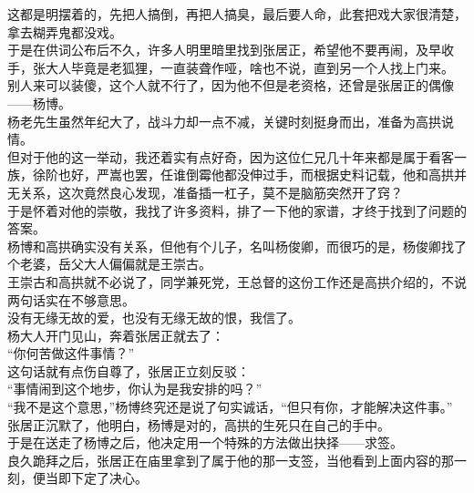 \begin{multicols}{\theparacolNo}
这都是明摆着的，先把人搞倒，再把人搞臭，最后要人命，此套把戏大家很清楚，拿去糊弄鬼都没戏。\\

于是在供词公布后不久，许多人明里暗里找到张居正，希望他不要再闹，及早收手，张大人毕竟是老狐狸，一直装聋作哑，啥也不说，直到另一个人找上门来。\\

别人来可以装傻，这个人就不行了，因为他不但是老资格，还曾是张居正的偶像——杨博。\\

杨老先生虽然年纪大了，战斗力却一点不减，关键时刻挺身而出，准备为高拱说情。\\

但对于他的这一举动，我还着实有点好奇，因为这位仁兄几十年来都是属于看客一族，徐阶也好，严嵩也罢，任谁倒霉他都没伸过手，而根据史料记载，他和高拱并无关系，这次竟然良心发现，准备插一杠子，莫不是脑筋突然开了窍？\\

于是怀着对他的崇敬，我找了许多资料，排了一下他的家谱，才终于找到了问题的答案。\\

杨博和高拱确实没有关系，但他有个儿子，名叫杨俊卿，而很巧的是，杨俊卿找了个老婆，岳父大人偏偏就是王崇古。\\

王崇古和高拱就不必说了，同学兼死党，王总督的这份工作还是高拱介绍的，不说两句话实在不够意思。\\

没有无缘无故的爱，也没有无缘无故的恨，我信了。\\

杨大人开门见山，奔着张居正就去了：\\

“你何苦做这件事情？”\\

这句话就有点伤自尊了，张居正立刻反驳：\\

“事情闹到这个地步，你认为是我安排的吗？”\\

“我不是这个意思，”杨博终究还是说了句实诚话，“但只有你，才能解决这件事。”\\

张居正沉默了，他明白，杨博是对的，高拱的生死只在自己的手中。\\

于是在送走了杨博之后，他决定用一个特殊的方法做出抉择——求签。\\

良久跪拜之后，张居正在庙里拿到了属于他的那一支签，当他看到上面内容的那一刻，便当即下定了决心。\\


\end{multicols}
